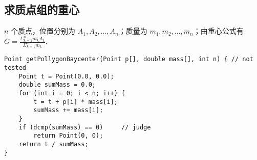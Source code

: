 \subsection{求质点组的重心}
$n$ 个质点，位置分别为 $A_1, A_2, ..., A_n$；质量为 $m_1, m_2, ..., m_n$；由重心公式有 $G = \frac{\Sigma_{k=1}^{n}{m_kA_k}}{\Sigma_{k=1}^{n}{m_k}}$.

\begin{verbatim}
Point getPollygonBaycenter(Point p[], double mass[], int n) { // not tested
    Point t = Point(0.0, 0.0);
    double sumMass = 0.0;
    for (int i = 0; i < n; i++) {
        t = t + p[i] * mass[i];
        sumMass += mass[i];
    }
    if (dcmp(sumMass) == 0)     // judge
        return Point(0, 0);
    return t / sumMass;
}
\end{verbatim}

